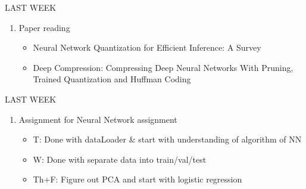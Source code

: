 \begin{frame}{LAST WEEK}
    \begin{enumerate}
        \item Paper reading
        \begin{itemize}
            \item{Neural Network Quantization for Efficient Inference: A Survey}
            \item{Deep Compression: Compressing Deep Neural Networks With Pruning, Trained Quantization and Huffman Coding}
        \end{itemize}
    \end{enumerate}
\end{frame}

\begin{frame}{LAST WEEK}
    \begin{enumerate}
        \item Assignment for Neural Network assignment
        \begin{itemize}
            \item{T:} Done with dataLoader & start with understanding of algorithm of NN
            \item{W:} Done with separate data into train/val/test
            \item{Th+F:} Figure out PCA and start with logistic regression
        \end{itemize}
    \end{enumerate}
\end{frame}


